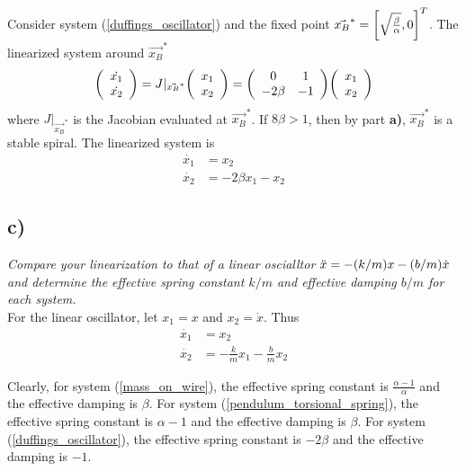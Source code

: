 \documentclass[12pt]{article}
\begin{document}
Consider system (\ref{duffings_oscillator}) and the fixed point $\vec{x_B}^* = \qty[\sqrt{\frac{\beta}{\alpha}},0]^T$.  The linearized system around $\vec{x_B}^*$
\begin{align*}
    \qty(\begin{array}{c}\dot{x_1} \\ \dot{x_2}\end{array}) = J|_{\vec{x_B}^*}\qty(\begin{array}{c}x_1 \\ x_2\end{array}) = \qty(\begin{array}{cc}0 & 1 \\ -2\beta & -1\end{array})\qty(\begin{array}{c}x_1 \\ x_2\end{array})
\end{align*}
where $J|_{\vec{x_B}^*}$ is the Jacobian evaluated at $\vec{x_B}^*$.  If $8\beta > 1$, then by part \textbf{a)}, $\vec{x_B}^*$ is a stable spiral.  The linearized system is
\begin{align*}
    \dot{x_1} &= x_2 \\
    \dot{x_2} &= -2\beta x_1 - x_2
\end{align*}

\subsection*{ c)}
\emph{Compare your linearization to that of a linear oscialltor $\ddot{x} = -\qty(k/m)x - \qty(b/m)\dot{x}$ and determine the effective spring constant $k/m$ and effective damping $b/m$ for each system.} \\

For the linear oscillator, let $x_1 = x$ and $x_2 = \dot{x}$.  Thus
\begin{align*}
    \dot{x_1} &= x_2 \\
    \dot{x_2} &= -\frac{k}{m}x_1 - \frac{b}{m}x_2
\end{align*}

Clearly, for system (\ref{mass_on_wire}), the effective spring constant is $\frac{\alpha - 1}{\alpha}$ and the effective damping is $\beta$.  For system (\ref{pendulum_torsional_spring}), the effective spring constant is $\alpha - 1$ and the effective damping is $\beta$.  For system (\ref{duffings_oscillator}), the effective spring constant is $-2\beta$ and the effective damping is $-1$.
\end{document}
